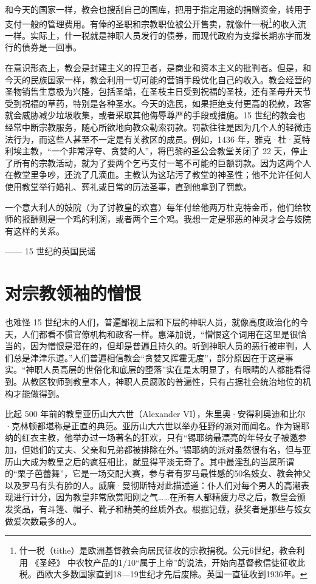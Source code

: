 和今天的国家一样，教会也搜刮自己的国库，把用于指定用途的捐赠资金，转用于支付一般的管理费用。有俸的圣职和宗教职位被公开售卖，就像什一税\footnote{什一税（tithe）是欧洲基督教会向居民征收的宗教捐税。公元6世纪，教会利用 《圣经》 中农牧产品的1/10“属于上帝”的说法，开始向基督教信徒征收此税。西欧大多数国家直到18—19世纪才先后废除。英国一直征收到1936年。}的收入流一样。实际上，什一税就是神职人员发行的债券，而现代政府为支撑长期赤字而发行的债券是一回事。

在意识形态上，教会是封建主义的捍卫者，是商业和资本主义的批判者。但是，和今天的民族国家一样，教会利用一切可能的营销手段优化自己的收入。教会经营的圣物销售生意极为兴隆，包括圣蜡，在圣枝主日受到祝福的圣枝，还有圣母升天节受到祝福的草药，特别是各种圣水。今天的选民，如果拒绝支付更高的税款，政客就会威胁减少垃圾收集，或者采取其他侮辱尊严的手段或措施。15 世纪的教会也经常中断宗教服务，随心所欲地向教众勒索罚款。罚款往往是因为几个人的轻微违法行为，而这些人甚至不一定是有关教区的成员。例如，1436 年，雅克·杜·夏特利埃主教，“一个非常浮夸、贪婪的人”，将巴黎的圣公会教堂关闭了 22 天，停止了所有的宗教活动，就为了要两个乞丐支付一笔不可能的巨额罚款。因为这两个人在教堂里争吵，还流了几滴血。主教认为这玷污了教堂的神圣性；他不允许任何人使用教堂举行婚礼、葬礼或日常的历法圣事，直到他拿到了罚款。

\begin{tcolorbox}
\kaishu 一个意大利人的妓院（为了讨教皇的欢喜）每年付给他两万杜克特金币，他们给牧师的报酬则是一个鸡的利润，或者两个三个鸡。我想一定是邪恶的神灵才会与妓院有这样的关系。
\begin{flushright}
—— 15 世纪的英国民谣
\end{flushright}
\end{tcolorbox}

\section{对宗教领袖的憎恨}
也难怪 15 世纪末的人们，普遍鄙视上层和下层的神职人员，就像高度政治化的今天，人们都看不惯官僚机构和政客一样。惠泽加说，“憎恨这个词用在这里是很恰当的，因为憎恨是潜在的，但却是普遍且持久的。听到神职人员的恶行被审判，人们总是津津乐道。”人们普遍相信教会“贪婪又挥霍无度”，部分原因在于这是事实。“神职人员高层的世俗化和底层的堕落”实在是太明显了，有眼睛的人都能看得到。从教区牧师到教皇本人，神职人员腐败的普遍性，只有占据社会统治地位的机构才能做得到。

比起 500 年前的教皇亚历山大六世（Alexander VI），朱里奥·安得利奥迪和比尔·克林顿都堪称是正直的典范。亚历山大六世以举办狂野的派对而闻名。作为锡耶纳的红衣主教，他举办过一场著名的狂欢，只有“锡耶纳最漂亮的年轻女子被邀参加，但她们的丈夫、父亲和兄弟都被排除在外。”锡耶纳的派对虽然很有名，但与亚历山大成为教皇之后的疯狂相比，就显得平淡无奇了。其中最淫乱的当属所谓的“栗子芭蕾舞”，它是一场交配大赛，参与者有罗马最性感的50名妓女、教会神父以及罗马有头有脸的人。威廉·曼彻斯特对此描述道：仆人们对每个男人的高潮表现进行计分，因为教皇非常欣赏阳刚之气……在所有人都精疲力尽之后，教皇会颁发奖品，有斗篷、帽子、靴子和精美的丝质外衣。根据记载，获奖者是那些与妓女做爱次数最多的人。

